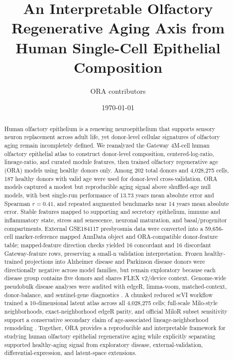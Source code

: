 \documentclass[11pt]{article}
\title{An Interpretable Olfactory Regenerative Aging Axis from Human Single-Cell Epithelial Composition}
\author{ORA contributors}
\date{\today}
\begin{document}
\maketitle

\begin{abstract}
Human olfactory epithelium is a renewing neuroepithelium that supports sensory neuron replacement across adult life, yet donor-level cellular signatures of olfactory aging remain incompletely defined. We reanalyzed the Gateway 4M-cell human olfactory epithelial atlas \citep{gateway2026} to construct donor-level composition, centered-log-ratio, lineage-ratio, and curated module features, then trained olfactory regenerative age (ORA) models using healthy donors only. Among 202 total donors and 4,028,275 cells, 187 healthy donors with valid age were used for donor-level cross-validation. ORA models captured a modest but reproducible aging signal above shuffled-age null models, with best single-run performance of 13.73 years mean absolute error and Spearman $r=0.41$, and repeated augmented benchmarks near 14 years mean absolute error. Stable features mapped to supporting and secretory epithelium, immune and inflammatory state, stress and senescence, neuronal maturation, and basal/progenitor compartments. External GSE184117 presbyosmia data \citep{oliva2022} were converted into a 59,656-cell marker-reference mapped AnnData object and ORA-compatible donor-feature table; mapped-feature direction checks yielded 16 concordant and 16 discordant Gateway-feature rows, preserving a small-n validation interpretation. Frozen healthy-trained projections into Alzheimer disease and Parkinson disease donors were directionally negative across model families, but remain exploratory because each disease group contains five donors and shares FLEX v2/device context. Genome-wide pseudobulk disease analyses were audited with edgeR, limma-voom, matched-context, donor-balance, and sentinel-gene diagnostics \citep{edger2010,voom2014,limma2015}. A chunked reduced scVI workflow trained a 10-dimensional latent atlas across all 4,028,275 cells; full-scale Milo-style neighborhoods, exact-neighborhood edgeR parity, and official MiloR subset sensitivity support a conservative secondary claim of age-associated lineage-neighborhood remodeling \citep{scvi2018,scvitools2022,milo2022}. Together, ORA provides a reproducible and interpretable framework for studying human olfactory epithelial regenerative aging while explicitly separating supported healthy-aging signal from exploratory disease, external-validation, differential-expression, and latent-space extensions.
\end{abstract}
\end{document}
